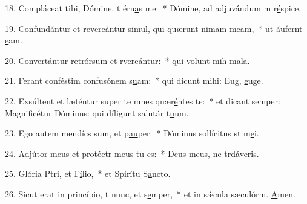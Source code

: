 18. Compláceat tibi, Dómine, t éru\uline{a}s me:~* Dómine, ad adjuvándum m r\uline{é}spice.\par 
19. Confundántur et revereántur simul, qui quærunt nimam m\uline{e}am,~* ut áufernt \uline{e}am.\par 
20. Convertántur retrórsum et rvere\uline{á}ntur:~* qui volunt mih m\uline{a}la.\par 
21. Ferant conféstim confusónem s\uline{u}am:~* qui dicunt mihi: Eug, \uline{e}uge.\par 
22. Exsúltent et læténtur super te mnes quær\uline{é}ntes te:~* et dicant semper: Magnificétur Dóminus: qui díligunt salutár t\uline{u}um.\par 
23. Ego autem mendícs sum, et p\uline{au}per:~* Dóminus sollícitus st m\uline{e}i.\par 
24. Adjútor meus et protéctr meus t\uline{u} es:~* Deus meus, ne trd\uline{á}veris.\par 
25. Glória Ptri, et F\uline{í}lio,~* et Spirítu S\uline{a}ncto.\par 
26. Sicut erat in princípio, t nunc, et s\uline{e}mper,~* et in sǽcula sæculórm. \uline{A}men.\par 
